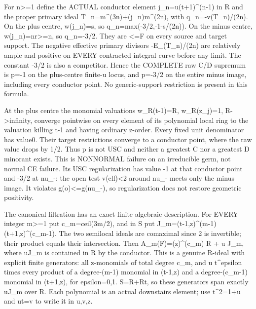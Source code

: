 \documentclass[11pt]{article}
\begin{document}
For n\textgreater{}=1 define the ACTUAL conductor element j\_n=u(t+1)\textasciicircum{}(n-1) in R and the proper primary ideal T\_n=m\textasciicircum{}(3n)+(j\_n)m\textasciicircum{}(2n), with q\_n=-v(T\_n)/(2n). On the plus centre, w(j\_n)=s, so q\_n=max(-3/2,-1-s/(2n)). On the minus centre, w(j\_n)=nr\textgreater{}=n, so q\_n=-3/2. They are \textless{}=F on every source and target support. The negative effective primary divisors -E\_(T\_n)/(2n) are relatively ample and positive on EVERY contracted integral curve before any limit. The constant -3/2 is also a competitor. Hence the COMPLETE raw C/D supremum is
p=-1 on the plus-centre finite-u locus, and p=-3/2 on the entire minus image, including every conductor point.
No generic-support restriction is present in this formula.

At the plus centre the monomial valuations w\_R(t-1)=R, w\_R(z\_j)=1, R-\textgreater{}infinity, converge pointwise on every element of its polynomial local ring to the valuation killing t-1 and having ordinary z-order. Every fixed unit denominator has value0. Their target restrictions converge to a conductor point, where the raw value drops by 1/2. Thus p is not USC and neither a greatest C nor a greatest D minorant exists. This is NONNORMAL failure on an irreducible germ, not normal CE failure. Its USC regularization has value -1 at that conductor point and -3/2 at nu\_-: the open test v(ell)\textless{}2 around nu\_- meets only the minus image. It violates g(o)\textless{}=g(nu\_-), so regularization does not restore geometric positivity.

The canonical filtration has an exact finite algebraic description. For EVERY integer m\textgreater{}=1 put c\_m=ceil(3m/2), and in S put
J\_m=(t-1,z)\textasciicircum{}(m-1)(t+1,z)\textasciicircum{}(c\_m-1).
The two semilocal ideals are comaximal since 2 is invertible; their product equals their intersection. Then
A\_m(F)=(z)\textasciicircum{}(c\_m) R + u J\_m,
where uJ\_m is contained in R by the conductor. This is a genuine R-ideal with explicit finite generators: all z-monomials of total degree c\_m, and u t\textasciicircum{}epsilon times every product of a degree-(m-1) monomial in (t-1,z) and a degree-(c\_m-1) monomial in (t+1,z), for epsilon=0,1. S=R+Rt, so these generators span exactly uJ\_m over R. Each polynomial is an actual downstairs element; use t\textasciicircum{}2=1+u and ut=v to write it in u,v,z.
\end{document}
